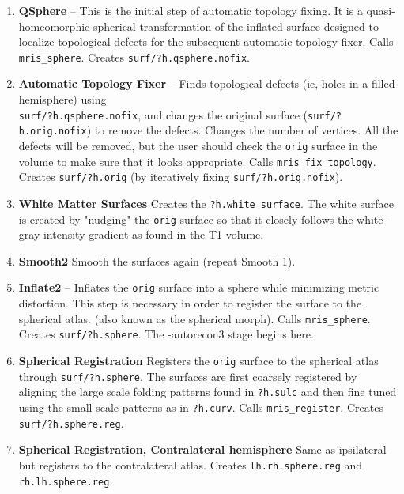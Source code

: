 \documentclass[paper=a4, fontsize=11pt]{scrartcl} %
\numberwithin{equation}{section} %
\numberwithin{figure}{section} %
\numberwithin{table}{section} %
\begin{document}
\begin{enumerate}
    \item \textbf{QSphere} -- This is the initial step of automatic topology fixing. It is a quasi-homeomorphic spherical transformation of the inflated surface designed to localize topological defects for the subsequent automatic topology fixer. Calls \texttt{mris\_sphere}. Creates \texttt{surf/?h.qsphere.nofix}.
    
    \item \textbf{Automatic Topology Fixer} -- Finds topological defects (ie, holes in a filled hemisphere) using \\ \texttt{surf/?h.qsphere.nofix}, and changes the original surface (\texttt{surf/?h.orig.nofix}) to remove the defects. Changes the number of vertices. All the defects will be removed, but the user should check the \texttt{orig} surface in the volume to make sure that it looks appropriate. Calls \texttt{mris\_fix\_topology}. Creates \texttt{surf/?h.orig} (by iteratively fixing \texttt{surf/?h.orig.nofix}).
    
    \item \textbf{White Matter Surfaces} Creates the \texttt{?h.white surface}. The white surface is created by "nudging" the \texttt{orig} surface so that it closely follows the white-gray intensity gradient as found in the T1 volume.
    
    \item \textbf{Smooth2} Smooth the surfaces again (repeat Smooth 1).

    \item \textbf{Inflate2} -- Inflates the \texttt{orig} surface into a sphere while minimizing metric distortion. This step is necessary in order to register the surface to the spherical atlas. (also known as the spherical morph). Calls \texttt{mris\_sphere}. Creates \texttt{surf/?h.sphere}. The -autorecon3 stage begins here.
   
    \item \textbf{Spherical Registration } Registers the \texttt{orig} surface to the spherical atlas through \texttt{surf/?h.sphere}. The surfaces are first coarsely registered by aligning the large scale folding patterns found in \texttt{?h.sulc} and then fine tuned using the small-scale patterns as in \texttt{?h.curv}. Calls \texttt{mris\_register}. Creates \texttt{surf/?h.sphere.reg}.
    
    \item \textbf{Spherical Registration, Contralateral hemisphere} Same as ipsilateral but registers to the contralateral atlas. Creates \texttt{lh.rh.sphere.reg} and \texttt{rh.lh.sphere.reg}.


\end{enumerate}
\end{document}
